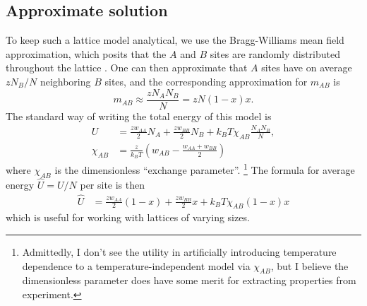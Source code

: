 \documentclass[10pt]{article}
\begin{document}
\subsection{Approximate solution}
To keep such a lattice model analytical, we use the Bragg-Williams mean field approximation, which posits that the $A$ and $B$ sites are randomly distributed throughout the lattice \cite{flory}.
One can then approximate that $A$ sites have on average $z N_B / N$ neighboring $B$ sites, and the corresponding approximation for $m_{AB}$ is
\begin{equation}
    m_{AB} \approx \frac{z N_A N_B}{N} = z N (1-x) x.
\end{equation}
The standard way of writing the total energy of this model is
\begin{align}
    U &=
    \frac{z w_{AA}}{2} N_A +
    \frac{z w_{BB}}{2} N_B +
    k_B T \chi_{AB} \frac{N_A N_B}{N}, \\
    \chi_{AB} &=
    \frac{z}{k_B T} \left( w_{AB} - \frac{w_{AA} + w_{BB}}{2} \right)
    \label{eqn:BW_solution}
\end{align}
where $\chi_{AB}$ is the dimensionless ``exchange parameter''. \footnote{Admittedly, I don't see the utility in artificially introducing temperature dependence to a temperature-independent model via $\chi_{AB}$, but I believe the dimensionless parameter does have some merit for extracting properties from experiment.}
The formula for average energy $\hat{U}=U/N$ per site is then
\begin{align}
    \hat{U} &=
    \frac{z w_{AA}}{2} (1-x) +
    \frac{z w_{BB}}{2} x +
    k_B T \chi_{AB} (1-x) x
\end{align}
which is useful for working with lattices of varying sizes.
\end{document}
